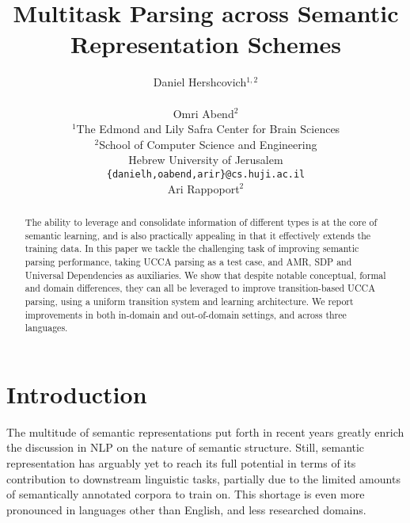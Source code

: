 \documentclass[11pt,a4paper]{article}
\title{Multitask Parsing across Semantic Representation Schemes}
\author{Daniel Hershcovich$^{1,2}$ \\
  \\\And
  Omri Abend$^2$ \\
  $^1$The Edmond and Lily Safra Center for Brain Sciences \\
  $^2$School of Computer Science and Engineering \\
  Hebrew University of Jerusalem \\
  \texttt{\{danielh,oabend,arir\}@cs.huji.ac.il}
  \\\And
  Ari Rappoport$^2$
}
\date{}
\begin{document}
\maketitle

\begin{abstract}
The ability to leverage and consolidate information of different types
is at the core of semantic learning, and is also practically appealing
in that it effectively extends the training data. In this paper we
tackle the challenging task of improving semantic parsing
performance, taking UCCA
parsing as a test case, and AMR, SDP and Universal Dependencies
as auxiliaries. We show that despite notable conceptual,
formal and domain differences, they can all be
leveraged to improve transition-based UCCA parsing, 
using a uniform transition system and learning architecture. 
We report improvements
in both in-domain and out-of-domain settings, and across three languages.
\end{abstract}

\section{Introduction}\label{sec:introduction}

The multitude of semantic representations put forth in recent years greatly enrich
the discussion in NLP on the nature of semantic structure.
Still, semantic representation has arguably yet to reach its full 
potential in terms of its contribution to downstream linguistic tasks,
partially due to the limited amounts of semantically annotated
corpora to train on. This shortage is even more pronounced in 
languages other than English, and less researched domains. 

\end{document}
